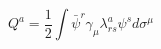 \begin{equation}
Q^{a} = \frac{1}{2} \int \bar{\psi}^{r} \gamma_{\mu} 
\lambda_{rs}^{a} \psi^{s} d \sigma^{\mu} 
\end{equation}

